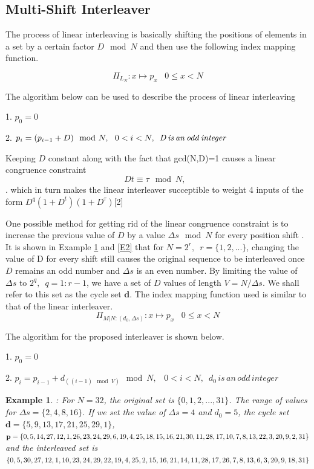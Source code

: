 \documentclass[technicalreport]{ieicej}
\newtheorem{example}[theorem]{Example}
\begin{document}
 \subsection{Multi-Shift Interleaver}
 The process of linear interleaving is basically shifting the positions of elements in
 a set by a certain factor $D \mod N$ and then use the following index mapping function.
 
 $$\Pi_{\mathit{L}_{N}} : x \mapsto p_x\,\,\,\,\, 0\leq x<N$$
 
 The algorithm below can be used to describe the process of linear interleaving
  
   1. $p_0=0$
 
  2. $p_i=(p_{i-1}+D) \mod N,\,\,\,\,\, \\0<i<N,\,\,\, \mathit{D \,is \,an \,odd \,integer}$
 
 
 Keeping $D$ constant along with the fact that gcd(N,D)=1 causes a linear congruence
  constraint 
 $$ Dt \equiv \tau \mod N, \,\,\,\, $$. which in turn makes the
  linear interleaver succeptible to weight 4 inputs of the form 
  $D^q(1+D^t)(1+D^{\tau})$[2]
 
  One possible method for getting rid of the linear congruence constraint is to increase
  the previous value of $D$ by a value $\Delta s \mod N$  for every position shift . 
  It is shown in Example \ref{E1} and \ref{E2}
   that for $N=2^r,\,\,\, r=\{1,2,...\}$, changing the value of D for every shift still 
   causes
   the original sequence to be interleaved once $D$ remains an odd number and $\Delta s$
   is an even number. By limiting the value of $\Delta s$ to $2^q,\,\,\, q=1:r-1$, we 
   have a set of $D$ values of length $V=N/\Delta s$. We shall refer to this 
   set as the cycle set $\mathbf{d}$. The index mapping
   function used is similar to that of the linear interleaver. 
   $$\Pi_{\mathit{M}|{N:(d_0,\Delta s)}} : x \mapsto p_x\,\,\,\,\, 0\leq x<N$$
  
  The algorithm for the proposed interleaver is shown below.
  
   1. $p_0=0$
 
 2. $p_i=p_{i-1}+d_{((i-1) \mod V) } \mod N,\,\,\,\,\, 0<i<N,\,\,\, \mathit{d_0 \,is \,an \,odd \,integer}$
 

 
 
 \begin{example}
 \label{E1}
 : For $N=32$, the original set is $\{0,1,2,...,31\}$. The range of values for 
 $\Delta s = \{ 2,4,8,16\}$.  If we set the value
 of $\Delta s = 4$ and $d_0=5$, the cycle set
 $\mathbf{d} = \{ 5,9,13,17,21,25,29,1\}$, \\
 $\mathbf{p}= \{ 0, 5, 14, 27, 12, 1, 26, 23, 24, 29, 6, 19, 4, 25, 18, 15, 16, 21\\,
 30, 11, 28, 17, 10, 7, 8, 13, 22, 3, 20, 9, 2, 31\}$ 
 and the interleaved set is 
$\{0,5,30,27,12,1,10,23,24,29,22,19, 4, 25 ,2, 15\\,16, 21, 14, 11, 28,17,
  26, 7, 8, 13, 6, 3, 20, 9, 18, 31\}$
 \end{example}
 
\end{document}
